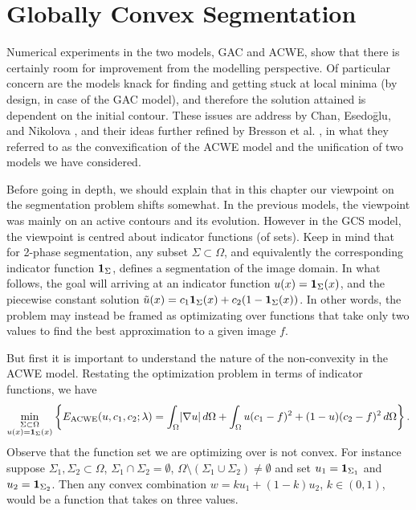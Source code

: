 \chapter{Globally Convex Segmentation}
Numerical experiments in the two models, GAC and ACWE, show that there is certainly room for improvement from the modelling perspective. Of particular concern are the models knack for finding and getting stuck at local minima (by design, in case of the GAC model), and therefore the solution attained is dependent on the initial contour. These issues are address by Chan, Esedo\={g}lu, and Nikolova \cite{chan2006algorithms}, and their ideas further refined by Bresson et al. \cite{bresson2007fast}, in what they referred to as the convexification of the ACWE model and the unification of two models we have considered.

Before going in depth, we should explain that in this chapter our viewpoint on the segmentation problem shifts somewhat. In the previous models, the viewpoint was mainly on an active contours and its evolution. However in the GCS model, the viewpoint is centred about indicator functions (of sets). Keep in mind that for 2-phase segmentation, any subset $\Sigma \subset \Omega$, and equivalently the corresponding indicator function $\mathbf{1}_\Sigma$, defines a segmentation of the image domain. In what follows, the goal will arriving at an indicator function $u(x) = \mathbf{1}_\Sigma(x)$, and the piecewise constant solution $\tilde u(x) = c_1 \mathbf{1}_\Sigma(x) + c_2 (1 - \mathbf{1}_\Sigma(x))$. In other words, the problem may instead be framed as optimizating over functions that take only two values to find the best approximation to a given image $f$.

But first it is important to understand the nature of the non-convexity in the ACWE model. Restating the optimization problem in terms of indicator functions, we have 
\begin{align}
\min_{\substack{\Sigma\subset\Omega \\ 
		u(x) = \mathbf{1}_\Sigma(x)}} 
\left\{E_\textrm{ACWE}(u, c_1, c_2; \lambda)
= \int_{\Omega} \lvert\nabla u\rvert \,d\Omega 
+ \int_\Omega u(c_1 - f)^2   + (1-u)(c_2 - f)^2 \,d\Omega 
\right\}.
\label{eq:eacwe2}
\end{align}
Observe that the function set we are optimizing over is not convex. For instance suppose $\Sigma_1, \Sigma_2 \subset \Omega$, $\Sigma_1 \cap \Sigma_2 = \emptyset$, $\Omega \setminus (\Sigma_1 \cup \Sigma_2) \neq \emptyset$ and set $u_1 = \mathbf{1}_{\Sigma_1}$ and $u_2 = \mathbf{1}_{\Sigma_2}$. Then any convex combination $w = ku_1 + (1-k)u_2$, $k \in (0,1)$, would be a function that takes on three values. 

